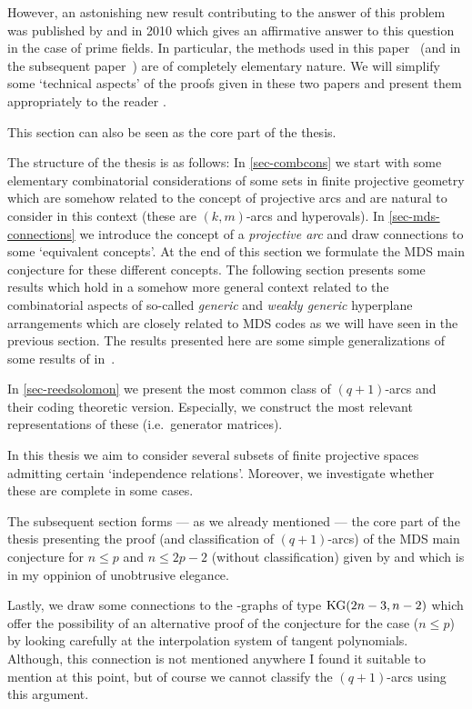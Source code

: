 However, an astonishing new result contributing to the answer of this problem was published by  and  in 2010 which gives an affirmative answer to this question in the case of prime fields. In particular, the methods used in this paper~\cite{ball2011mdsmainconjI} (and in the subsequent paper~\cite{ball2012mdsmainconjII}) are of completely elementary nature. We will simplify some `technical aspects' of the proofs given in these two papers and present them appropriately to the reader .

This section can also be seen as the core part of the thesis.

The structure of the thesis is as follows:
In \autoref{sec-combcons} we start with some elementary combinatorial considerations of some sets in finite projective geometry which are somehow related to the concept of projective arcs and are natural to consider in this context (these are $(k,m)$-arcs and hyperovals).
In \autoref{sec-mds-connections} we introduce the concept of a \emph{projective arc} and draw connections to some `equivalent concepts'. At the end of this section we formulate the MDS main conjecture for these different concepts.
The following section presents some results which hold in a somehow more general context related to the combinatorial aspects of so-called \emph{generic} and \emph{weakly generic} hyperplane arrangements which are closely related to MDS codes as we will have seen in the previous section. The results presented here are some simple generalizations of some results of  in~\cite{zas}.

In \autoref{sec-reedsolomon} we present the most common class of $(q+1)$-arcs and their coding theoretic version.
Especially, we construct the most relevant representations of these (i.e.~generator matrices).

In this thesis we aim to consider several subsets of finite projective spaces admitting certain `independence relations'. Moreover, we investigate whether these are complete in some cases.

The subsequent section forms --- as we already mentioned --- the core part of the thesis presenting the proof (and classification of $(q+1)$-arcs) of the MDS main conjecture for $n\leq p$ and $n\leq 2p-2$ (without classification) given by  and  which is in my oppinion of unobtrusive elegance.

Lastly, we draw some connections to the -graphs of type $\mathop\mathrm{KG}(2n-3,n-2)$ which offer the possibility of an alternative proof of the conjecture for the case ($n\leq p$) by looking carefully at the interpolation system of tangent polynomials. Although, this connection is not mentioned anywhere I found it suitable to mention at this point, but of course we cannot classify the $(q+1)$-arcs using this argument.

